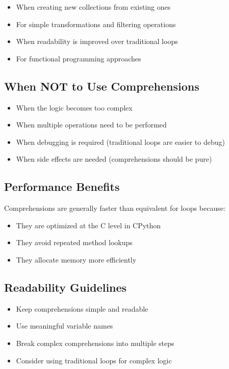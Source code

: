 \documentclass[12pt,a4paper]{article}
\begin{document}
\begin{itemize}
    \item When creating new collections from existing ones
    \item For simple transformations and filtering operations
    \item When readability is improved over traditional loops
    \item For functional programming approaches
\end{itemize}

\subsection{When NOT to Use Comprehensions}

\begin{itemize}
    \item When the logic becomes too complex
    \item When multiple operations need to be performed
    \item When debugging is required (traditional loops are easier to debug)
    \item When side effects are needed (comprehensions should be pure)
\end{itemize}

\subsection{Performance Benefits}

Comprehensions are generally faster than equivalent for loops because:
\begin{itemize}
    \item They are optimized at the C level in CPython
    \item They avoid repeated method lookups
    \item They allocate memory more efficiently
\end{itemize}

\subsection{Readability Guidelines}

\begin{itemize}
    \item Keep comprehensions simple and readable
    \item Use meaningful variable names
    \item Break complex comprehensions into multiple steps
    \item Consider using traditional loops for complex logic
\end{itemize}
\end{document}
